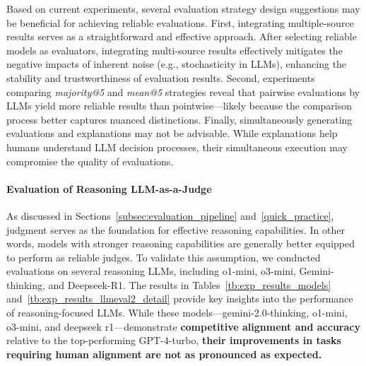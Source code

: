 Based on current experiments, several evaluation strategy design suggestions may be beneficial for achieving reliable evaluations. First, integrating multiple-source results serves as a straightforward and effective approach. After selecting reliable models as evaluators, integrating multi-source results effectively mitigates the negative impacts of inherent noise (e.g., stochasticity in LLMs), enhancing the stability and trustworthiness of evaluation results. Second, experiments comparing \textit{majority@5} and \textit{mean@5} strategies reveal that pairwise evaluations by LLMs yield more reliable results than pointwise—likely because the comparison process better captures nuanced distinctions. Finally, simultaneously generating evaluations and explanations may not be advisable. While explanations help humans understand LLM decision processes, their simultaneous execution may compromise the quality of evaluations.


\paragraph{\textbf{Evaluation of Reasoning LLM-as-a-Judge}}
\label{subsec:evaluation_of_reasoning_model}
As discussed in Sections~\ref{subsec:evaluation_pipeline} and~\ref{quick_practice}, judgment serves as the foundation for effective reasoning capabilities. In other words, models with stronger reasoning capabilities are generally better equipped to perform as reliable judges. To validate this assumption, we conducted evaluations on several reasoning LLMs, including o1-mini, o3-mini, Gemini-thinking, and Deepseek-R1. 
The results in Tables~\ref{tb:exp_results_models} and~\ref{tb:exp_results_llmeval2_detail} provide key insights into the performance of reasoning-focused LLMs. While these models—gemini-2.0-thinking, o1-mini, o3-mini, and deepseek r1—demonstrate \textbf{competitive alignment and accuracy} relative to the top-performing GPT-4-turbo, \textbf{their improvements in tasks requiring human alignment are not as pronounced as expected.}



